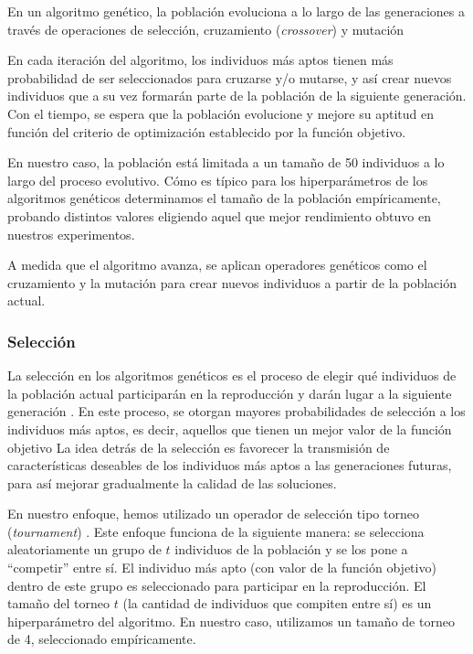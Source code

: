 En un algoritmo genético, la población evoluciona a lo largo de las generaciones a través de operaciones de selección, 
cruzamiento (\emph{crossover}) y mutación \cite{Goldberg:1989}

En cada iteración del algoritmo, los individuos más aptos tienen más probabilidad de ser seleccionados para cruzarse y/o mutarse, 
y así crear nuevos individuos que a su vez formarán parte de la población de la siguiente generación. Con el tiempo, se espera que la población evolucione y
mejore su aptitud en función del criterio de optimización establecido por la función objetivo.

En nuestro caso, la población está limitada a un tamaño de 50 individuos a lo largo del proceso evolutivo.
Cómo es típico para los hiperparámetros de los algoritmos genéticos determinamos el tamaño de la población empíricamente, probando distintos valores
eligiendo aquel que mejor rendimiento obtuvo en nuestros experimentos.

A medida que el algoritmo avanza, se aplican operadores genéticos como el cruzamiento y la mutación para crear nuevos individuos a partir de la población actual.

\subsubsection{Selección}
\label{sec:selection}
La selección en los algoritmos genéticos es el proceso de elegir qué individuos de la población actual participarán en la reproducción y darán lugar a la siguiente generación \cite{Goldberg:1989}. En este proceso, se otorgan mayores probabilidades de selección a los individuos más aptos, es decir, aquellos que tienen un mejor valor de la función objetivo \cite{Goldberg:1989}
La idea detrás de la selección es favorecer la transmisión de características deseables de los individuos más aptos a las generaciones futuras, para así mejorar gradualmente la calidad de las soluciones.

En nuestro enfoque, hemos utilizado un operador de selección tipo torneo (\emph{tournament}) \cite{Goldberg:1989}. Este enfoque funciona de la siguiente manera: se selecciona aleatoriamente un grupo de $t$ individuos de la población y se los pone a ``competir'' entre sí. El individuo más apto (con valor de la función objetivo) dentro de este grupo es seleccionado para participar en la reproducción. El tamaño del torneo $t$ (la cantidad de individuos que compiten entre sí) es un hiperparámetro del algoritmo. En nuestro caso, utilizamos un tamaño de torneo de 4, seleccionado empíricamente.

